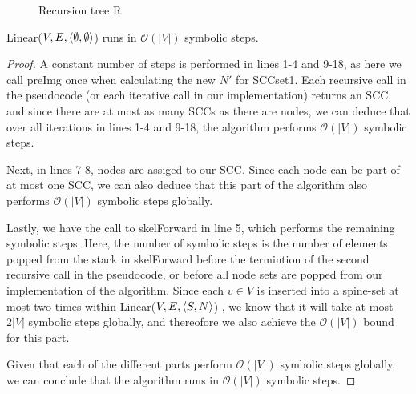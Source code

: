 \documentclass[../master/master.tex]{subfiles}
\begin{document}
\begin{figure}
  \centering
{}
\caption{Recursion tree R}
\label{R}
\end{figure}

\begin{theorem}\label{linear} Linear($V, E, \langle \emptyset, \emptyset\rangle$) runs in $\mathcal{O}(|V|)$ symbolic steps.
\end{theorem}
\begin{proof} A constant number of steps is performed in lines 1-4 and 9-18, as here we call preImg once when calculating the new $N'$ for SCCset1. Each recursive call in the pseudocode (or each iterative call in our implementation) returns an SCC, and since there are at most as many SCCs as there are nodes, we can deduce that over all iterations in lines 1-4 and 9-18, the algorithm performs $\mathcal{O}(|V|)$ symbolic steps.

Next, in lines 7-8, nodes are assiged to our SCC. Since each node can be part of at most one SCC, we can also deduce that this part of the algorithm also performs $\mathcal{O}(|V|)$ symbolic steps globally.

Lastly, we have the call to skelForward in line 5, which performs the remaining symbolic steps. Here, the number of symbolic steps is the number of elements popped from the stack in skelForward before the termintion of the second recursive call in the pseudocode, or before all node sets are popped from our implementation of the algorithm. Since each $v\in V$ is inserted into a spine-set at most two times within Linear($V, E, \langle S, N\rangle$) \cite[p.~137-138]{linear}, we know that it will take at most $2|V|$ symbolic steps globally, and thereofore we also achieve the $\mathcal{O}(|V|)$ bound for this part.

Given that each of the different parts perform $\mathcal{O}(|V|)$ symbolic steps globally, we can conclude that the algorithm runs in $\mathcal{O}(|V|)$ symbolic steps.
\end{proof}
\end{document}
